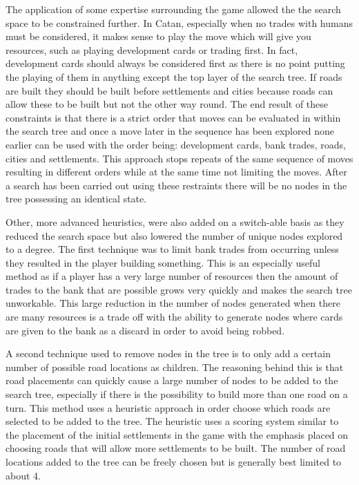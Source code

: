 \documentclass[]{article}
\begin{document}
\par The application of some expertise surrounding the game allowed the the search space to be constrained further. In Catan, especially when no trades with humans must be considered, it makes sense to play the move which will give you resources, such as playing development cards or trading first. In fact, development cards should always be considered first as there is no point putting the playing of them in anything except the top layer of the search tree. If roads are built they should be built before settlements and cities because roads can allow these to be built but not the other way round. The end result of these constraints is that there is a strict order that moves can be evaluated in within the search tree and once a move later in the sequence has been explored none earlier can be used with the order being: development cards, bank trades, roads, cities and settlements. This approach stops repeats of the same sequence of moves resulting in different orders while at the same time not limiting the moves. After a search has been carried out using these restraints there will be no nodes in the tree possessing an identical state.
 
\par Other, more advanced heuristics, were also added on a switch-able basis as they reduced the search space but also lowered the number of unique nodes explored to a degree. The first technique was to limit bank trades from occurring unless they resulted in the player building something. This is an especially useful method as if a player has a very large number of resources then the amount of trades to the bank that are possible grows very quickly and makes the search tree unworkable. This large reduction in the number of nodes generated when there are many resources is a trade off with the ability to generate nodes where cards are given to the bank as a discard in order to avoid being robbed.

\par A second technique used to remove nodes in the tree is to only add a certain number of possible road locations as children. The reasoning behind this is that road placements can quickly cause a large number of nodes to be added to the search tree, especially if there is the possibility to build more than one road on a turn. This method uses a heuristic approach in order choose which roads are selected to be added to the tree. The heuristic uses a scoring system similar to the placement of the initial settlements in the game with the emphasis placed on choosing roads that will allow more settlements to be built. The number of road locations added to the tree can be freely chosen but is generally best limited to about 4.
\end{document}

